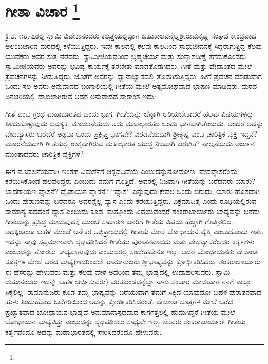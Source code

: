 
\chapter[ಗೀತಾ ವಿಚಾರ ]{ಗೀತಾ ವಿಚಾರ \protect\footnote{}}

ಕ್ರಿ.ಶ. ೧೮೯೭ರಲ್ಲಿ ಸ್ವಾಮಿ ವಿವೇಕಾನಂದರು ಕಲ್ಕತ್ತೆಯಲ್ಲಿದ್ದಾಗ ಬಹುಕಾಲವನ್ನೆಲ್ಲ\break ಶ‍್ರೀರಾಮಕೃಷ್ಣ ಸಂಘದ ಕೇಂದ್ರವಾದ ಆಲಂಬಜಾರಿನ ಮಠದಲ್ಲಿ ಕಳೆಯುತ್ತಿದ್ದರು. ಇದೇ ಕಾಲದಲ್ಲಿ ಕೆಲವು ಕಾಲದಿಂದ ಸಾಧುಜೀವನಕ್ಕೆ ಸಿದ್ಧರಾಗುತ್ತಿದ್ದ ಕೆಲವು ಯುವಕರು ಅವರ ಸುತ್ತ ನೆರೆದರು. ಸ್ವಾಮೀಜಿಯವರಿಂದ ಬ್ರಹ್ಮಚರ್ಯ ಮತ್ತು ಸಂನ್ಯಾಸದೀಕ್ಷೆ ತೆಗೆದು\-ಕೊಂಡರು. ಸ್ವಾಮೀಜಿಯವರು ಅವರನ್ನು ಭವಿಷ್ಯ ಕಾರ್ಯಕ್ಕೆ ತರಬೇತು ಮಾಡತೊಡಗಿದರು. ಗೀತೆ ಮತ್ತು ವೇದಾಂತದ ಮೇಲೆ ಪ್ರವಚನಗಳನ್ನು ನೀಡುತ್ತಿದ್ದರು. ಜೊತೆಗೆ ಅವರನ್ನು ಧ್ಯಾನಾಭ್ಯಾಸದಲ್ಲಿ ತೊಡಗಿಸುತ್ತಿದ್ದರು. ಹೀಗೆ ಪ್ರವಚನ ಮಾಡುವಾಗ ಒಂದು ಸಲ ಅವರು ಅನುವಾದದ ಬಂಗಾಲಿಯಲ್ಲಿ ಗೀತೆಯ ಮೇಲೆ ಅತ್ಯಮೋಘವಾದ ಭಾಷಣ ಮಾಡಿದರು. ಮಠದ ದಿನಚರಿಯಲ್ಲಿ ದಾಖಲಾಗಿರುವ ಅದರ ಅನುವಾದದ ಸಾರಾಂಶ ಇದು:

ಗೀತೆ ಎಂಬ ಗ್ರಂಥ ಮಹಾಭಾರತದ ಒಂದು ಭಾಗ. ಗೀತೆಯನ್ನು ಚೆನ್ನಾಗಿ ಅರಿಯಬೇಕಾದರೆ ಹಲವು ವಿಷಯಗಳನ್ನು ತಿಳಿದುಕೊಳ್ಳುವುದು ಅವಶ್ಯಕ. ಮೊದಲನೆಯದು ಅದು ಮಹಾಭಾರತದ ಒಂದು ಭಾಗವಾಗಿತ್ತೆಂಬುದು. ಅಂದರೆ ಅದನ್ನು ವೇದವ್ಯಾಸರು ಬರೆದರೆ ಅಥವಾ ಒಂದು ಪ್ರಕ್ಷಿಪ್ತ ಭಾಗವೇ? ಎರಡನೆಯದಾಗಿ ಶ‍್ರೀಕೃಷ್ಣ ಎಂಬ ಚಾರಿತ್ರಿಕ ವ್ಯಕ್ತಿ ಇದ್ದನೆ? ಮೂರನೆಯದಾಗಿ ಗೀತೆಯಲ್ಲಿ ಉಕ್ತವಾಗಿರುವ ಮಹಾಭಾರತ ಯುದ್ಧ ನಿಜವಾಗಿ ಜರುಗಿತೆ? ನಾಲ್ಕನೆಯದು ಅರ್ಜುನ ಮುಂತಾದವರು ಚಾರಿತ್ರಿಕ ವ್ಯಕ್ತಿಗಳೆ?

ಈಗ ಮೊದಲನೆಯದಾಗಿ ಇಂತಹ ವಿಮರ್ಶೆಗೆ ಆಸ್ಪದವಿದೆಯೆ ಎಂಬುದನ್ನು\break ನೋಡೋಣ. ವೇದವ್ಯಾಸರೆಂದು ಕರೆಯಿಸಿಕೊಂಡ ಹಲವರಿದ್ದರು ಎಂಬುದು ನಮಗೆ ಗೊತ್ತಿದೆ. ಅವರಲ್ಲಿ ನಿಜವಾಗಿ ಗೀತೆಯನ್ನು ಬರೆದವರು ಯಾರು? ಬಾದರಾಯಣ ವ್ಯಾಸನೆ? ದ್ವೈಪಾಯನ ವ್ಯಾಸನೆ? “ವ್ಯಾಸ” ಎನ್ನುವುದು ಕೇವಲ ಒಂದು ಬಿರುದು, ಯಾರು ಹೊಸದಾಗಿ ಒಂದು ಪುರಾಣವನ್ನು ಬರೆದರೂ ಅವರನ್ನೆಲ್ಲ ವ್ಯಾಸ ಎಂದು ಕರೆಯು\-ತ್ತಿದ್ದರು. ವಿಕ್ರಮಾದಿತ್ಯ ಎಂದು ರೂಢಿಯಲ್ಲಿರುವ ಸಾಮಾನ್ಯ ಪದದಂತೆ ವ್ಯಾಸ ಎಂಬುದು ಕೂಡ. ಮತ್ತೊಂದು ವಿಷಯವೆಂದರೆ ಶಂಕರಾಚಾರ್ಯರು ಭಾಷ್ಯವನ್ನು ಬರೆದು ಗೀತೆಯನ್ನು ಪ್ರಸಿದ್ಧ ಮಾಡುವುದಕ್ಕೆ ಮುಂಚೆ ಸಾಧಾರಣ ಜನರಿಗೆ ಗೀತೆಯ ವಿಷಯ ಹೆಚ್ಚಾಗಿ ಗೊತ್ತಿರಲಿಲ್ಲ. ಅದಕ್ಕಿಂತಲೂ ಬಹಳ ಮುಂಚೆ ಅನೇಕರ ಅಭಿಪ್ರಾಯದಲ್ಲಿ ಗೀತೆಯ ಮೇಲೆ ಬೋಧಾಯನ ವೃತ್ತಿ ಎಂಬುದೊಂದು ಇತ್ತು. ಇದನ್ನು ನಾವು ಸಪ್ರಮಾಣವಾಗಿ ದೃಢಪಡಿಸಿದರೆ ಗೀತೆಯು ಪುರಾತನವಾದದು ಮತ್ತು ವೇದವ್ಯಾಸರೆ\break ಅದರ ಕರ್ತೃಗಳು ಎಂಬುದನ್ನು ತೋರಲು ಸಾಧ್ಯವಾಗುವುದು ಎಂಬುದರಲ್ಲಿ ಸಂದೇಹವೇನೂ ಇಲ್ಲ. ಆದರೆ ಬೋಧಾಯನರು ವೇದಾಂತ ಸೂತ್ರಗಳ ಮೇಲೆ ಬರೆದ ಭಾಷ್ಯ\break (ಇದರಿಂದಲೇ ರಾಮಾನುಜರು ಶ‍್ರೀಭಾಷ್ಯವನ್ನು ಕ್ರೋಢೀಕರಿಸಿದರು. ಶಂಕರಾಚಾರ್ಯರು ಈ ಹೆಸರನ್ನು ಹೇಳುವರು ಮತ್ತು ಕೆಲವು ವೇಳೆ ಅದರಿಂದ ತಮ್ಮ ಭಾಷ್ಯದಲ್ಲಿ ಉದಾಹರಿಸು\-ವರು. ಸ್ವಾಮಿ ದಯಾನಂದರು ಇದನ್ನೇ ಬಹಳ ಚರ್ಚಿಸುವರು) ಭರತಖಂಡವನ್ನೆಲ್ಲಾ ನಾನು ಸಂಚಾರ ಮಾಡುವಾಗ ನನಗೆ ಎಲ್ಲೂ ಸಿಕ್ಕಲಿಲ್ಲ. ರಾಮಾನುಜರು ಕೂಡ ತಮ್ಮ ಭಾಷ್ಯವನ್ನು ಬರೆಯುವಾಗ ತಮಗೆ ಸಿಕ್ಕಿದ ಯಾವುದೋ ಬಹಳ ಪುರಾತನವಾದ ಹುಳು ತಿಂದುಹೋದ ಓಲೆಗರಿಯಿಂದ ಅದನ್ನು ಕ್ರೋಢೀಕರಿಸಿದರಂತೆ. ವೇದಾಂತ ಸೂತ್ರಗಳ ಮೇಲೆ ಬರೆದ ಪ್ರಖ್ಯಾತವಾದ ಬೋಧಾಯನ ಭಾಷ್ಯವೆ ಅನುಮಾನಾಸ್ಪದವಾದ ಕಾರ್ಗತ್ತಲಲ್ಲಿ ಹುದುಗಿದ್ದರೆ ಗೀತೆಯ ಮೇಲೆ ಬೋಧಾಯನ ಭಾಷ್ಯವಿತ್ತು ಎಂಬುದನ್ನು ದೃಢಪಡಿಸಲು ಸಾಧ್ಯವೇ ಇಲ್ಲ. ಕೆಲವರು ಶಂಕರಾಚಾರ್ಯರೇ ಗೀತೆಯ ಕರ್ತೃವೆಂದೂ ಅದನ್ನು ಮಹಾಭಾರತದಲ್ಲಿ ಸೇರಿಸಿದರೆಂದೂ ಹೇಳುವರು.

